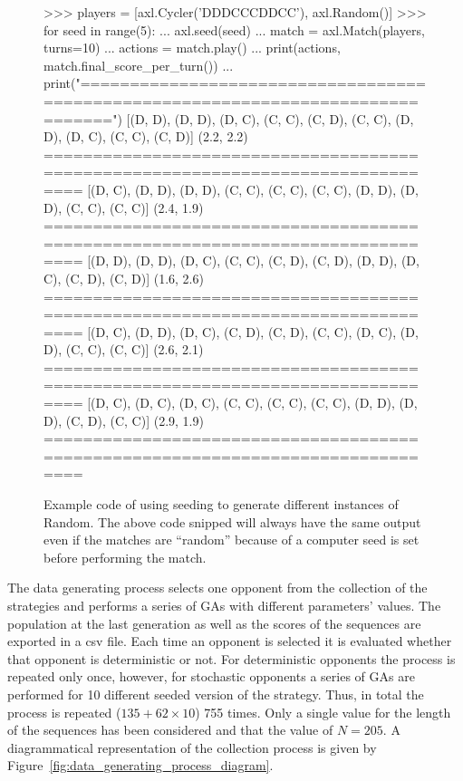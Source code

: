 \begin{figure}[!htbp]
    \begin{usagepy}
>>> players = [axl.Cycler('DDDCCCDDCC'), axl.Random()]
>>> for seed in range(5):
...   axl.seed(seed)
...   match = axl.Match(players, turns=10)
...   actions = match.play()
...   print(actions, match.final_score_per_turn())
...   print("================================================================================")
[(D, D), (D, D), (D, C), (C, C), (C, D), (C, C), (D, D), (D, C), (C, C), (C, D)] (2.2, 2.2)
================================================================================
[(D, C), (D, D), (D, D), (C, C), (C, C), (C, C), (D, D), (D, D), (C, C), (C, C)] (2.4, 1.9)
================================================================================
[(D, D), (D, D), (D, C), (C, C), (C, D), (C, D), (D, D), (D, C), (C, D), (C, D)] (1.6, 2.6)
================================================================================
[(D, C), (D, D), (D, C), (C, D), (C, D), (C, C), (D, C), (D, D), (C, C), (C, C)] (2.6, 2.1)
================================================================================
[(D, C), (D, C), (D, C), (C, C), (C, C), (C, C), (D, D), (D, D), (C, D), (C, C)] (2.9, 1.9)
================================================================================
    \end{usagepy}
\caption{Example code of using seeding to generate different instances of Random.
The above code snipped will always have the same output even if the matches are
``random'' because of a computer seed is set before performing the
match.}\label{fig:random_apl_example}
\end{figure}

The data generating process selects one opponent from the collection of the
\numberofstrategiesbestsequences strategies and performs a series of GAs with
different parameters' values. The population at the last generation as well as
the scores of the sequences are exported in a csv file. Each time an opponent is
selected it is evaluated whether that opponent is deterministic or not. For
deterministic opponents the process is repeated only once, however, for
stochastic opponents a series of GAs are performed for 10 different seeded
version of the strategy. Thus, in total the process is repeated (\(135 + 62
\times 10\)) 755 times. Only a single value for the length of the
sequences has been considered and that the value of \(N=205\). A diagrammatical
representation of the collection process is given by
Figure~\ref{fig:data_generating_process_diagram}.


